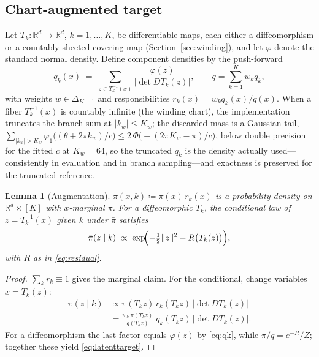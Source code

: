 \documentclass[11pt]{article}
\newtheorem{lemma}{Lemma}
\theoremstyle{remark}
\newcommand{\R}{\mathbb{R}}
\begin{document}
\subsection{Chart-augmented target}
Let $T_k:\R^d\to\R^d$, $k=1,\dots,K$, be differentiable maps, each either
a diffeomorphism or a countably-sheeted covering map
(Section~\ref{sec:winding}), and let $\varphi$ denote the standard normal
density. Define component densities by the push-forward
\begin{equation}
q_k(x)\;=\;\sum_{z\in T_k^{-1}(x)}
\frac{\varphi(z)}{\bigl|\det DT_k(z)\bigr|},
\qquad
q=\sum_{k=1}^K w_kq_k,
\label{eq:qk}
\end{equation}
with weights $w\in\Delta_{K-1}$ and responsibilities
$r_k(x)=w_kq_k(x)/q(x)$. When a fiber $T_k^{-1}(x)$ is countably
infinite (the winding chart), the implementation truncates the branch
sum at $|k_w|\le K_w$; the discarded mass is a Gaussian tail,
$\sum_{|k_w|>K_w}\varphi_1\!\bigl((\theta+2\pi k_w)/c\bigr)\le
2\,\Phi\!\bigl(-(2\pi K_w-\pi)/c\bigr)$, below double precision for
the fitted $c$ at $K_w{=}64$, so the truncated $q_k$ is the density
actually used---consistently in evaluation and in branch
sampling---and exactness is preserved for the truncated reference.

\begin{lemma}[Augmentation]\label{lem:aug}
$\bar\pi(x,k)\coloneqq\pi(x)\,r_k(x)$ is a probability density on
$\R^d\times[K]$ with $x$-marginal $\pi$. For a diffeomorphic $T_k$, the
conditional law of $z=T_k^{-1}(x)$ given $k$ under $\bar\pi$ satisfies
\begin{equation}
\bar\pi(z\mid k)\;\propto\;
\exp\!\Bigl(-\tfrac12\lVert z\rVert^2-R\bigl(T_k(z)\bigr)\Bigr),
\label{eq:latenttarget}
\end{equation}
with $R$ as in \eqref{eq:residual}.
\end{lemma}
\begin{proof}
$\sum_kr_k\equiv1$ gives the marginal claim. For the conditional, change
variables $x=T_k(z)$:
\begin{align*}
\bar\pi(z\mid k)
&\propto\pi(T_kz)\,r_k(T_kz)\,\bigl|\det DT_k(z)\bigr|\\
&=\frac{w_k\,\pi(T_kz)}{q(T_kz)}\;q_k(T_kz)\,\bigl|\det DT_k(z)\bigr|.
\end{align*}
For a diffeomorphism the last factor equals $\varphi(z)$ by
\eqref{eq:qk}, while $\pi/q=e^{-R}/Z$; together these yield
\eqref{eq:latenttarget}.
\end{proof}
\end{document}
